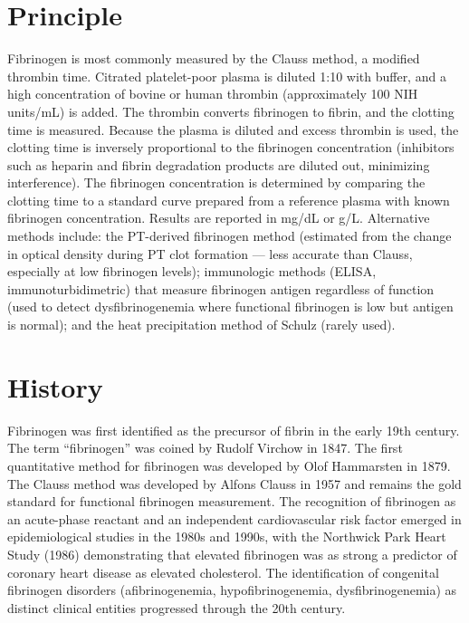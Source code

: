 \section*{Principle}
Fibrinogen is most commonly measured by the Clauss method, a modified thrombin time. Citrated platelet-poor plasma is diluted 1:10 with buffer, and a high concentration of bovine or human thrombin (approximately 100 NIH units/mL) is added. The thrombin converts fibrinogen to fibrin, and the clotting time is measured. Because the plasma is diluted and excess thrombin is used, the clotting time is inversely proportional to the fibrinogen concentration (inhibitors such as heparin and fibrin degradation products are diluted out, minimizing interference). The fibrinogen concentration is determined by comparing the clotting time to a standard curve prepared from a reference plasma with known fibrinogen concentration. Results are reported in mg/dL or g/L. Alternative methods include: the PT-derived fibrinogen method (estimated from the change in optical density during PT clot formation --- less accurate than Clauss, especially at low fibrinogen levels); immunologic methods (ELISA, immunoturbidimetric) that measure fibrinogen antigen regardless of function (used to detect dysfibrinogenemia where functional fibrinogen is low but antigen is normal); and the heat precipitation method of Schulz (rarely used).

\section*{History}
Fibrinogen was first identified as the precursor of fibrin in the early 19th century. The term ``fibrinogen'' was coined by Rudolf Virchow in 1847. The first quantitative method for fibrinogen was developed by Olof Hammarsten in 1879. The Clauss method was developed by Alfons Clauss in 1957 and remains the gold standard for functional fibrinogen measurement. The recognition of fibrinogen as an acute-phase reactant and an independent cardiovascular risk factor emerged in epidemiological studies in the 1980s and 1990s, with the Northwick Park Heart Study (1986) demonstrating that elevated fibrinogen was as strong a predictor of coronary heart disease as elevated cholesterol. The identification of congenital fibrinogen disorders (afibrinogenemia, hypofibrinogenemia, dysfibrinogenemia) as distinct clinical entities progressed through the 20th century.

